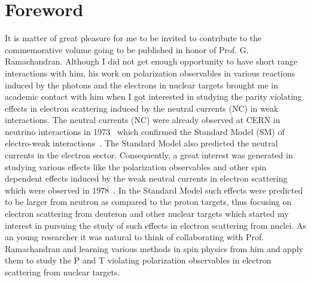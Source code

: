 \maketitle

\section{Foreword}
It is matter of great pleasure for me to be invited to contribute to the commemorative volume going to be published in honor of Prof. G. Ramachandran.  Although I did not get enough opportunity to have short range interactions with him, his work on polarization observables in various reactions induced by the photons and the electrons in nuclear targets brought me in academic contact with him when I got interested in studying the parity violating effects in electron scattering induced by the neutral currents (NC) in weak interactions. The neutral currents (NC) were already observed at CERN in neutrino interactions in 1973~\cite{Hasert:1973ff} which confirmed the Standard Model (SM) of electro-weak interactions~\cite{Weinberg:1967tq,Salam:1968rm}. The Standard Model also predicted the neutral currents in the electron sector.  Consequently, a great interest was generated in studying various effects like the polarization observables and other  spin dependent effects induced by the weak  neutral currents in electron scattering which were observed in 1978~\cite{Prescott:1978tm,Prescott:1979dh}. In the Standard Model such effects were predicted to be  larger from neutron as compared to the proton targets, thus focusing on electron scattering from   deuteron and other nuclear targets which started my interest in pursuing the study of such effects in electron scattering from nuclei.  As an young researcher it was natural to think of collaborating with Prof. Ramachandran and learning various methods in  spin physics from him and apply them to study the P and T violating polarization observables in electron scattering from nuclear targets. 

